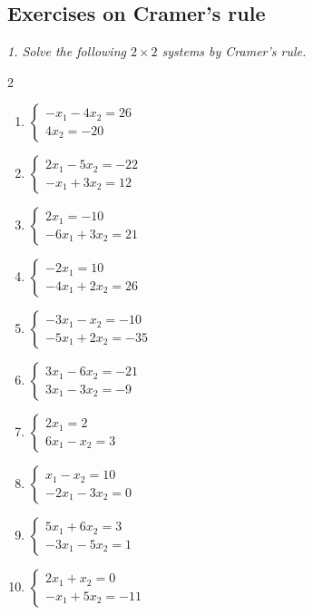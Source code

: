 \subsection{Exercises on Cramer’s rule}

\emph{1. Solve the following $2\times 2$ systems by Cramer’s rule.}
\bigskip
\begin{multicols}{2}\raggedright
\begin{enumerate}[label=\arabic*., leftmargin=*]
\item $\begin{cases}-x_1-4x_2=26\\4x_2=-20\end{cases}$
\item $\begin{cases}2x_1-5x_2=-22\\-x_1+3x_2=12\end{cases}$
\item $\begin{cases}2x_1=-10\\-6x_1+3x_2=21\end{cases}$
\item $\begin{cases}-2x_1=10\\-4x_1+2x_2=26\end{cases}$
\item $\begin{cases}-3x_1-x_2=-10\\-5x_1+2x_2=-35\end{cases}$
\item $\begin{cases}3x_1-6x_2=-21\\3x_1-3x_2=-9\end{cases}$
\item $\begin{cases}2x_1=2\\6x_1-x_2=3\end{cases}$
\item $\begin{cases}x_1-x_2=10\\-2x_1-3x_2=0\end{cases}$
\item $\begin{cases}5x_1+6x_2=3\\-3x_1-5x_2=1\end{cases}$
\item $\begin{cases}2x_1+x_2=0\\-x_1+5x_2=-11\end{cases}$

\end{enumerate}
\end{multicols}
